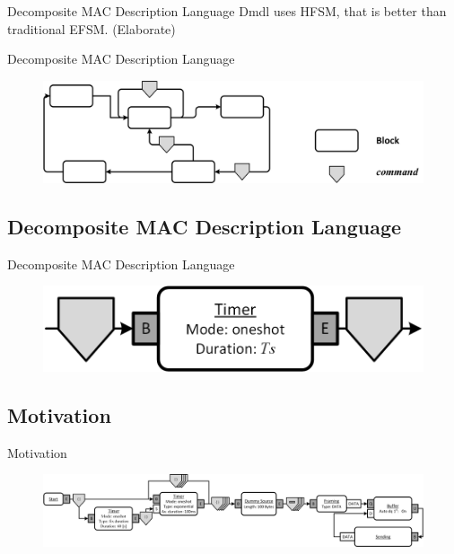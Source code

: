 \documentclass{beamer}
\begin{document}
\begin{frame}{Decomposite MAC Description Language}
    Dmdl uses HFSM, that is better than traditional EFSM. (Elaborate)
\end{frame}

\begin{frame}{Decomposite MAC Description Language}
	\begin{figure}
 		\includegraphics[width=\linewidth]{graph.png}
 		\label{fig:graph}
	\end{figure}
\end{frame}

\subsection{Decomposite MAC Description Language}
\begin{frame}{Decomposite MAC Description Language}
	\begin{figure}
 		\includegraphics[width=\linewidth]{simple_timer.png}
 		\label{fig:timer}
	\end{figure}
\end{frame}

\subsection{Motivation}
\begin{frame}{Motivation}
	\begin{figure}
 		\includegraphics[width=\linewidth]{pure_aloha.png}
 		\label{fig:aloha}
	\end{figure}
\end{frame}
\end{document}
